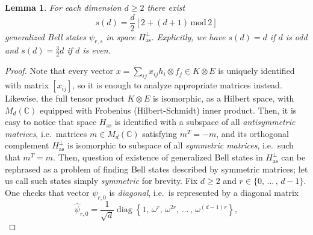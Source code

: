 \documentclass[reqno]{amsart}
\theoremstyle{plain}
\newtheorem{lemma}[theorem]{Lemma}
\theoremstyle{note}
\newcommand{\aspace}{H_{\mathrm{as}}}
\newcommand{\complexes}{\mathbb{C}}
\newcommand\diag{\operatorname{diag}}
\begin{document}
\begin{lemma}\label{lemma:ExistenceOfBellStates}
For each dimension $d \geqslant 2$ there exist 
\begin{equation}\label{eq:sOfDBellStates}
    s(d) = \frac{d}{2} \left[2 + (d+1) \, \mathrm{mod} \, 2\right]
\end{equation}
generalized Bell states $\psi_{r,s}$ in space $\aspace^{\perp}$. Explicitly, we have $s(d) = d$ if $d$ is odd and $s(d) = \frac{3}{2}d$ if $d$ is even.
\end{lemma}

\begin{proof}
Note that every vector $x = \sum_{ij} x_{ij} h_i \otimes f_j \in K\otimes E$ is uniquely identified with matrix $[x_{ij}]$, so it is enough to analyze appropriate matrices instead. Likewise, the full tensor product $K\otimes E$ is isomorphic, as a Hilbert space, with $M_{d}(\complexes)$ equipped with Frobenius (Hilbert-Schmidt) inner product. Then, it is easy to notice that space $\aspace$ is identified with a subspace of all \emph{antisymmetric matrices}, i.e.~matrices $m \in M_{d}(\complexes)$ satisfying $m^T = -m$, and its orthogonal complement $\aspace^{\perp}$ is isomorphic to subspace of all \emph{symmetric matrices}, i.e.~such that $m^T = m$. Then, question of existence of generalized Bell states in $\aspace^{\perp}$ can be rephrased as a problem of finding Bell states described by symmetric matrices; let us call such states simply \emph{symmetric} for brevity. Fix $d \geqslant 2$ and $r \in \{0,\,  \ldots \, , \, d-1\}$. One checks that vector $\psi_{r,0}$ is \emph{diagonal}, i.e.~is  represented by a diagonal matrix
\begin{equation}
    \hat{\psi}_{r,0} = \frac{1}{\sqrt{d}}\diag\left\{1,\, \omega^{r}, \, \omega^{2r}, \, \ldots \, , \, \omega^{(d-1)r}\right\},
\end{equation}

\end{proof}
\end{document}
